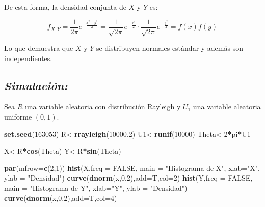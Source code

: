 \documentclass[]{article}
\newenvironment{Shaded}{\begin{snugshade}}{\end{snugshade}}
\newcommand{\KeywordTok}[1]{\textcolor[rgb]{0.13,0.29,0.53}{\textbf{#1}}}
\newcommand{\DataTypeTok}[1]{\textcolor[rgb]{0.13,0.29,0.53}{#1}}
\newcommand{\DecValTok}[1]{\textcolor[rgb]{0.00,0.00,0.81}{#1}}
\newcommand{\StringTok}[1]{\textcolor[rgb]{0.31,0.60,0.02}{#1}}
\newcommand{\OtherTok}[1]{\textcolor[rgb]{0.56,0.35,0.01}{#1}}
\newcommand{\OperatorTok}[1]{\textcolor[rgb]{0.81,0.36,0.00}{\textbf{#1}}}
\newcommand{\NormalTok}[1]{#1}
\begin{document}
De esta forma, la densidad conjunta de \(X\) y \(Y\) es:

\begin{equation}
f_{X,Y}=\frac{1}{2\pi}e^{-\frac{x^2+y^2}{2}}=\frac{1}{\sqrt{2\pi}}e^{-\frac{x^2}{2}} \cdot \frac{1}{\sqrt{2\pi}}e^{-\frac{y^2}{2}}=f(x)f(y)
\end{equation}

Lo que demuestra que \(X\) y \(Y\) se distribuyen normales estándar y
además son independientes.

\subsection{\texorpdfstring{\emph{Simulación:}}{Simulación:}}\label{simulacion-3}

Sea \(R\) una variable aleatoria con distribución Rayleigh y \(U_1\) una
variable aleatoria uniforme \((0,1)\).

\begin{Shaded}
\begin{Highlighting}[]
\KeywordTok{set.seed}\NormalTok{(}\DecValTok{163053}\NormalTok{)}
\NormalTok{R<-}\KeywordTok{rrayleigh}\NormalTok{(}\DecValTok{10000}\NormalTok{,}\DecValTok{2}\NormalTok{)}
\NormalTok{U1<-}\KeywordTok{runif}\NormalTok{(}\DecValTok{10000}\NormalTok{)}
\NormalTok{Theta<-}\DecValTok{2}\OperatorTok{*}\NormalTok{pi}\OperatorTok{*}\NormalTok{U1}

\NormalTok{X<-R}\OperatorTok{*}\KeywordTok{cos}\NormalTok{(Theta)}
\NormalTok{Y<-R}\OperatorTok{*}\KeywordTok{sin}\NormalTok{(Theta)}

\KeywordTok{par}\NormalTok{(}\DataTypeTok{mfrow=}\KeywordTok{c}\NormalTok{(}\DecValTok{2}\NormalTok{,}\DecValTok{1}\NormalTok{))}
\KeywordTok{hist}\NormalTok{(X,}\DataTypeTok{freq =} \OtherTok{FALSE}\NormalTok{, }\DataTypeTok{main =} \StringTok{"Histograma de X"}\NormalTok{, }\DataTypeTok{xlab=}\StringTok{"X"}\NormalTok{, }\DataTypeTok{ylab =} \StringTok{"Densidad"}\NormalTok{)}
\KeywordTok{curve}\NormalTok{(}\KeywordTok{dnorm}\NormalTok{(x,}\DecValTok{0}\NormalTok{,}\DecValTok{2}\NormalTok{),}\DataTypeTok{add=}\NormalTok{T,}\DataTypeTok{col=}\DecValTok{2}\NormalTok{)}
\KeywordTok{hist}\NormalTok{(Y,}\DataTypeTok{freq =} \OtherTok{FALSE}\NormalTok{, }\DataTypeTok{main =} \StringTok{"Histograma de Y"}\NormalTok{, }\DataTypeTok{xlab=}\StringTok{"Y"}\NormalTok{, }\DataTypeTok{ylab =} \StringTok{"Densidad"}\NormalTok{)}
\KeywordTok{curve}\NormalTok{(}\KeywordTok{dnorm}\NormalTok{(x,}\DecValTok{0}\NormalTok{,}\DecValTok{2}\NormalTok{),}\DataTypeTok{add=}\NormalTok{T,}\DataTypeTok{col=}\DecValTok{4}\NormalTok{)}
\end{Highlighting}
\end{Shaded}
\end{document}
